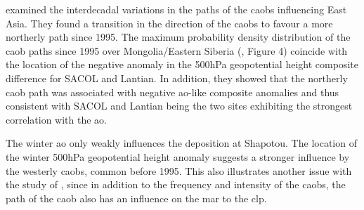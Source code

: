 \textcite{yang2020interdecadal} examined the interdecadal variations in the paths of the \acrshort{caob}s influencing East Asia. 
They found a transition in the direction of the \acrshort{caob}s to favour a more northerly path since 1995. The maximum probability density distribution of the \acrshort{caob} paths since 1995 over Mongolia/Eastern Siberia (\textcite{yang2020interdecadal}, Figure 4)  coincide with the location of the negative anomaly in the 500hPa geopotential height composite difference for SACOL and Lantian. 
In addition, they showed that the northerly \acrshort{caob} path was associated with negative \acrshort{ao}-like composite anomalies and thus consistent with SACOL and Lantian being the two sites exhibiting the strongest correlation with the \acrshort{ao}. 

The winter \acrshort{ao} only weakly influences the deposition at Shapotou. The location of the winter 500hPa geopotential height anomaly suggests a stronger influence by the westerly \acrshort{caob}s, common before 1995.       
This also illustrates another issue with the study of \textcite{wyrwoll2016cold}, since in addition to the frequency and intensity of the \acrshort{caob}s, the path of the \acrshort{caob} also has an influence on the \acrshort{mar} to the \acrshort{clp}.  



